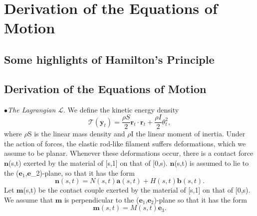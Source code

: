 \documentclass[12pt]{article}
\begin{document}
\section{Derivation of the Equations of Motion
}\label{Derivation of the Equations of Motion
}
\subsection{Some highlights of Hamilton's Principle}
\subsection{Derivation of the Equations of Motion}
$\bullet$\emph{The Lagrangian $\mathcal{L}$}. We define the kinetic energy density 
\[ \mathcal{T}(\mathbf{y}_t) = \frac{\rho S}{2} \mathbf{r}_t \cdot \mathbf{r}_t + \frac{\rho I}{2}\theta_t ^2,
\]
where $\rho$S is the linear mass density and $\rho$I the linear moment of inertia.
Under the action of forces, the elastic rod-like filament suffers deformations, which we assume to be planar. Whenever these deformations occur, there is a contact force
$\mathbf{n}$(s,t) exerted by the material of [s,1] on that of [0,s). $\mathbf{n}$(s,t) is assumed to lie to the ($\mathbf{e}_1$,$\mathbf{e}$_2)-plane, so that it has the form
\[  \mathbf{n}(s,t)= N(s,t) \mathbf{a}(s,t) + H(s,t)\mathbf{b} (s,t).
\]
Let $\mathbf{m}$(s,t) be the contact couple exerted by the material of [s,1] on that of [0,s). We assume that $\mathbf{m}$ is perpendicular to the ($\mathbf{e}_1$,$\mathbf{e}_2$)-plane so that it has the form
\[ 
\mathbf{m}(s,t) = M(s,t)\mathbf{e}_3.
\]
\end{document}
